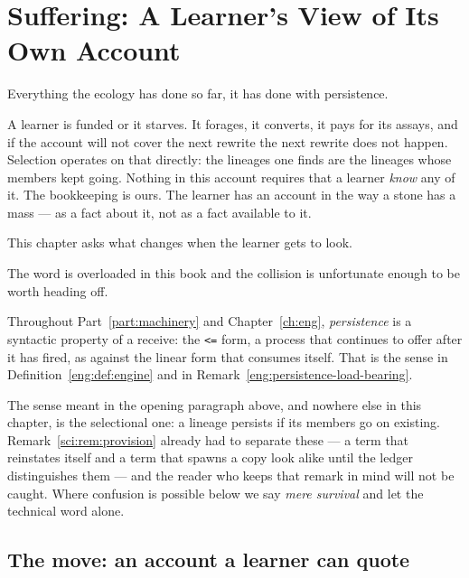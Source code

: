 \chapter{Suffering: A Learner's View of Its Own Account}
\label{ch:suffer}

Everything the ecology has done so far, it has done with persistence.

A learner is funded or it starves.
It forages, it converts, it pays for its assays, and if the account will
not cover the next rewrite the next rewrite does not happen.
Selection operates on that directly: the lineages one finds are the
lineages whose members kept going.
Nothing in this account requires that a learner \emph{know} any of it.
The bookkeeping is ours.
The learner has an account in the way a stone has a mass --- as a fact
about it, not as a fact available to it.

This chapter asks what changes when the learner gets to look.

\begin{remark}
\label{suf:rem:two-persistences}
The word is overloaded in this book and the collision is unfortunate
enough to be worth heading off.

Throughout Part~\ref{part:machinery} and Chapter~\ref{ch:eng},
\emph{persistence} is a syntactic property of a receive: the
\texttt{<=} form, a process that continues to offer after it has fired,
as against the linear form that consumes itself.
That is the sense in Definition~\ref{eng:def:engine} and in
Remark~\ref{eng:persistence-load-bearing}.

The sense meant in the opening paragraph above, and nowhere else in this
chapter, is the selectional one: a lineage persists if its members go on
existing.
Remark~\ref{sci:rem:provision} already had to separate these --- a term
that reinstates itself and a term that spawns a copy look alike until the
ledger distinguishes them --- and the reader who keeps that remark in mind
will not be caught.
Where confusion is possible below we say \emph{mere survival} and let the
technical word alone.
\end{remark}

\section{The move: an account a learner can quote}
\label{suf:S1}

